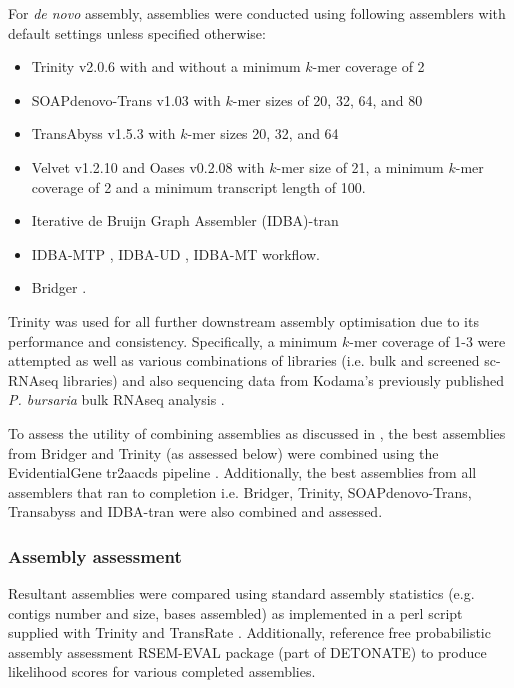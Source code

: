For \textit{de novo} assembly, assemblies were conducted using following 
assemblers with default settings unless specified otherwise:
\begin{itemize}
    \item Trinity v2.0.6 \citep{Grabherr2011} with and without a minimum \(k\)-mer coverage of 2
    \item SOAPdenovo-Trans v1.03 \citep{Xie2014} with \(k\)-mer sizes of 20, 32, 64, and 80   
    \item TransAbyss v1.5.3 \citep{Robertson2010} with \(k\)-mer sizes 20, 32, and 64 
    \item Velvet v1.2.10 \citep{Zerbino2008} and Oases v0.2.08 \citep{Schulz2012} with \(k\)-mer size of 
        21, a minimum \(k\)-mer coverage of 2 and a minimum transcript length
        of 100.
    \item Iterative de Bruijn Graph Assembler (IDBA)-tran \citep{Peng2010,Peng2012,Peng2013} 
    \item IDBA-MTP \citep{Leung2014}, IDBA-UD \citep{Peng2012}, IDBA-MT \citep{Leung2013} workflow.
    \item Bridger \citep{Chang2015}.
\end{itemize}

Trinity was used for all further downstream assembly optimisation due to its performance
and consistency.
Specifically, a minimum \(k\)-mer coverage of 1-3 were attempted as well as various
combinations of libraries (i.e. bulk and screened sc-RNAseq libraries) and also
sequencing data from Kodama's previously published \textit{P. bursaria} bulk
RNAseq analysis \citep{Kodama2014c}.


To assess the utility of combining assemblies as discussed in \citep{Nakasugi2014}, 
the best assemblies from Bridger and Trinity
(as assessed below) were combined using the EvidentialGene tr2aacds pipeline \citep{Gilbert2013}.
Additionally, the best assemblies from all assemblers that ran to completion i.e.
Bridger, Trinity, SOAPdenovo-Trans, Transabyss and IDBA-tran were also combined and 
assessed. 

\subsubsection{Assembly assessment}
\label{sec:assembly_assessment}

Resultant assemblies were compared using standard assembly statistics 
(e.g. contigs number and size, bases assembled) as implemented in a perl script supplied with 
Trinity \citep{Haas2013} and TransRate \citep{Smith-unna2015}. 
Additionally, reference free probabilistic assembly assessment RSEM-EVAL package (part of DETONATE) \citep{Li2014} to
produce likelihood scores for various completed assemblies.

